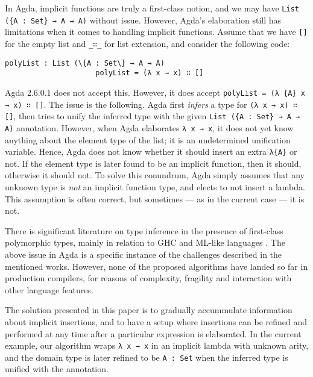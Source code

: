 \documentclass[acmsmall,review,anonymous,prologue,dvipsnames]{acmart}\settopmatter{printfolios=true,printccs=false,printacmref=false}
\begin{document}
In Agda, implicit functions are truly a first-class notion, and we may have
\texttt{List (\{A : Set\} → A → A)} without issue. However, Agda's elaboration
still has limitations when it comes to handling implicit functions. Assume that
we have \texttt{[]} for the empty list and \texttt{\_∷\_} for list extension,
and consider the following code:
\begin{Verbatim}[commandchars=\\\{\}]
                     polyList : List (\{A : Set\} → A → A)
                     polyList = (λ x → x) ∷ []
\end{Verbatim}
Agda 2.6.0.1 does not accept this. However, it does accept \texttt{polyList = (λ
  \{A\} x → x) ∷ []}. The issue is the following. Agda first \emph{infers} a
type for \texttt{(λ x → x) ∷ []}, then tries to unify the inferred type with the
given \texttt{List (\{A : Set\} → A → A)} annotation. However, when Agda
elaborates \texttt{λ x → x}, it does not yet know anything about the element
type of the list; it is an undetermined unification variable. Hence, Agda does
not know whether it should insert an extra \texttt{λ\{A\}} or not. If the
element type is later found to be an implicit function, then it should, otherwise it
should not. To solve this conundrum, Agda simply assumes that any unknown type
is \emph{not} an implicit function type, and elects to not insert a lambda. This
assumption is often correct, but sometimes --- as in the current case --- it is not.

There is significant literature on type inference in the presence of first-class
polymorphic types, mainly in relation to GHC and ML-like languages \cite{TODO}.
The above issue in Agda is a specific instance of the challenges described in
the mentioned works. However, none of the proposed algorithms have landed so far
in production compilers, for reasons of complexity, fragility and interaction
with other language features.

The solution presented in this paper is to gradually accummulate information
about implicit insertions, and to have a setup where insertions can be refined
and performed at any time after a particular expression is elaborated. In the
current example, our algorithm wraps \texttt{λ x → x} in an implicit lambda with
unknown arity, and the domain type is later refined to be \texttt{A : Set} when
the inferred type is unified with the annotation.
\end{document}
